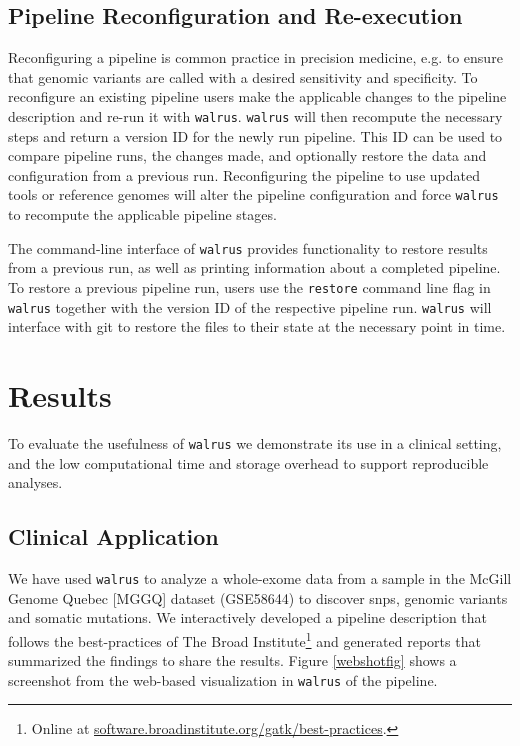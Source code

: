 \subsection{Pipeline Reconfiguration and Re-execution}
Reconfiguring a pipeline is common practice in precision medicine, e.g. to
ensure that genomic variants are called with a desired sensitivity and
specificity.  To reconfigure an existing pipeline users make the applicable
changes to the pipeline description and re-run it with \texttt{walrus}.
\texttt{walrus} will then recompute the necessary steps and return a version ID
for the newly run pipeline. This ID can be used to compare pipeline runs, the
changes made, and optionally restore the data and configuration from a
previous run.  Reconfiguring the pipeline to use updated tools or reference
genomes will alter the pipeline configuration and force \texttt{walrus} to
recompute the applicable pipeline stages. 

The command-line interface of \texttt{walrus} provides functionality to restore
results from a previous run, as well as printing information about a completed
pipeline.  To restore a previous pipeline run, users use the \texttt{restore}
command line flag in \texttt{walrus} together with the version ID of the
respective pipeline run. \texttt{walrus} will interface with git to restore the
files to their state at the necessary point in time.

\section{Results}
To evaluate the usefulness of \texttt{walrus} we demonstrate its use in a
clinical setting, and the low computational time and storage overhead to support
reproducible analyses.

\subsection{Clinical Application} 
We have used \texttt{walrus} to analyze a whole-exome data from a sample
in the McGill Genome Quebec [MGGQ] dataset (GSE58644)\cite{tofigh2014prognostic}
to discover \glspl{snp}, genomic variants and somatic mutations. We
interactively developed a pipeline description that follows the best-practices
of The Broad Institute\footnote{Online at
\url{software.broadinstitute.org/gatk/best-practices}.} and generated reports
that summarized the findings to share the results. Figure \ref{webshotfig} shows
a screenshot from the web-based visualization in \texttt{walrus} of the
pipeline. 

